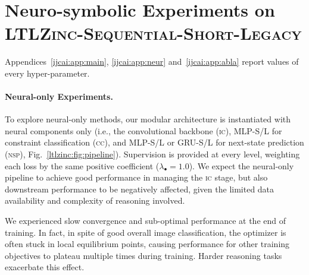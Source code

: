 \iffalse
\section{Neuro-symbolic Experiments on \textsc{LTLZinc-Sequential-Short-Legacy}}\label{ijcai:sec:exp}
%
%
Appendices~\ref{ijcai:app:main}, \ref{ijcai:app:neur} and~\ref{ijcai:app:abla} report values of every hyper-parameter.

\paragraph{Neural-only Experiments.}
To explore neural-only methods, our modular architecture is instantiated with neural components only (i.e., the convolutional backbone (\textsc{ic}), MLP-S/L for constraint classification (\textsc{cc}), and MLP-S/L or GRU-S/L for next-state prediction (\textsc{nsp}), Fig.~\ref{ltlzinc:fig:pipeline}). Supervision is provided at every level, weighting each loss by the same positive coefficient ($\lambda_{\bullet} = 1.0$). 
We expect the neural-only pipeline to achieve good performance in managing the \textsc{ic} stage, but also downstream performance to be negatively affected, given the limited data availability and complexity of reasoning involved.

We experienced slow convergence and sub-optimal performance at the end of training. In fact, in spite of good overall image classification, the optimizer is often stuck in local equilibrium points, causing performance for other training objectives to plateau multiple times during training. Harder reasoning tasks exacerbate this effect. %


